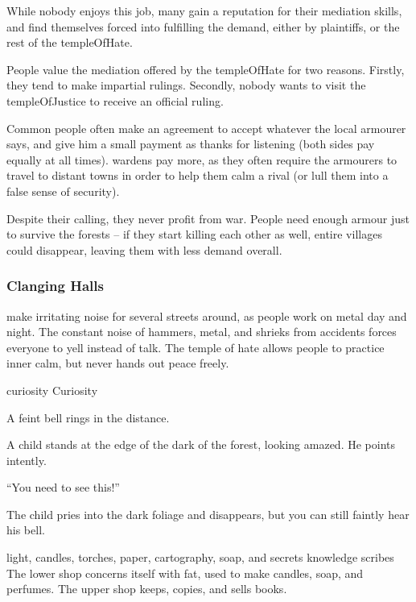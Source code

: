 \begin{multicols}{2}
\begin{description}
  While nobody enjoys this job, many gain a reputation for their mediation skills, and find themselves forced into fulfilling the demand, either by plaintiffs, or the rest of the \gls{templeOfHate}.
\end{description}

\noindent
People value the mediation offered by the \gls{templeOfHate} for two reasons.
Firstly, they tend to make impartial rulings.
Secondly, nobody wants to visit the \gls{templeOfJustice} to receive an official ruling.

Common people often make an agreement to accept whatever the local armourer says, and give him a small payment as thanks for listening (both sides pay equally at all times).
\Glspl{warden} pay more, as they often require the armourers to travel to distant towns in order to help them calm a rival (or lull them into a false sense of security).

\columnbreak

Despite their calling, they never profit from war.
People need enough armour just to survive the forests -- if they start killing each other as well, entire \glspl{village} could disappear, leaving them with less demand overall.

\subsubsection{Clanging Halls}
make irritating noise for several streets around, as people work on metal day and night.
The constant noise of hammers, metal, and shrieks from accidents forces everyone to yell instead of talk.
The temple of hate allows people to practice inner calm, but never hands out peace freely.


  {\gls{curiosity}}%
  {Curiosity}%
  {
    A feint bell rings in the distance.

    A child stands at the edge of the dark of the forest, looking amazed.
    He points intently.

    {\sffamily``You need to see this!''}

    The child pries into the dark foliage and disappears, but you can still faintly hear his bell.
  }%
  {light, candles, torches, paper, cartography, soap, and secrets}%
  {knowledge}%
  {\Glspl{scribe}}%
  {
    The lower shop concerns itself with fat, used to make candles, soap, and perfumes.
    The upper shop keeps, copies, and sells books.
  }%


\end{multicols}
